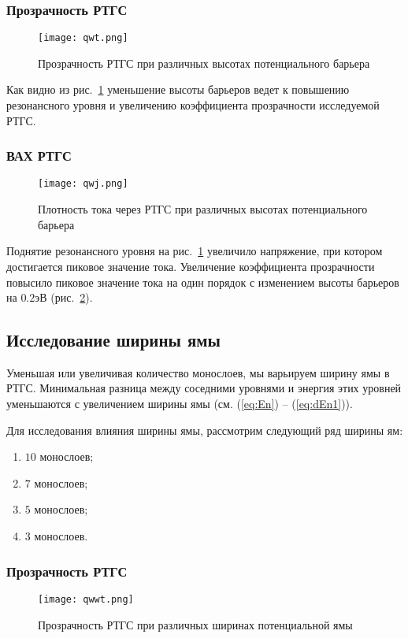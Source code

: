 \subsubsection{Прозрачность РТГС}
\begin{figure}[h]
	\centering
	\texttt{[image: qwt.png]}
	\caption{Прозрачность РТГС при различных высотах потенциального барьера}
	\label{fig:qwt}
\end{figure}

Как видно из рис.~\ref{fig:qwt} уменьшение высоты барьеров ведет к повышению резонансного уровня и увеличению коэффициента прозрачности исследуемой РТГС. 

\subsubsection{ВАХ РТГС}
\begin{figure}[h]
	\centering
	\texttt{[image: qwj.png]}
	\caption{Плотность тока через РТГС при различных высотах потенциального барьера}
	\label{fig:qwj}
\end{figure}

Поднятие резонансного уровня на рис.~\ref{fig:qwt} увеличило напряжение, при котором достигается пиковое значение тока. Увеличение коэффициента прозрачности повысило пиковое значение тока на один порядок с изменением высоты барьеров на $0.2$эВ (рис.~\ref{fig:qwj}).

\subsection{Исследование ширины ямы}
Уменьшая или увеличивая количество монослоев, мы варьируем ширину ямы в РТГС. Минимальная разница между соседними уровнями и энергия этих уровней уменьшаются с увеличением ширины ямы (см. (\ref{eq:En}) -- (\ref{eq:dEn1})).

Для исследования влияния ширины ямы, рассмотрим следующий ряд ширины ям:
\begin{enumerate}
	\item $10$ монослоев;
	\item $7$ монослоев;
	\item $5$ монослоев;
	\item $3$ монослоев.
\end{enumerate}

\subsubsection{Прозрачность РТГС}
\begin{figure}[h!]
	\centering
	\texttt{[image: qwwt.png]}
	\caption{Прозрачность РТГС при различных ширинах потенциальной ямы}
	\label{fig:qwwt}
\end{figure}

